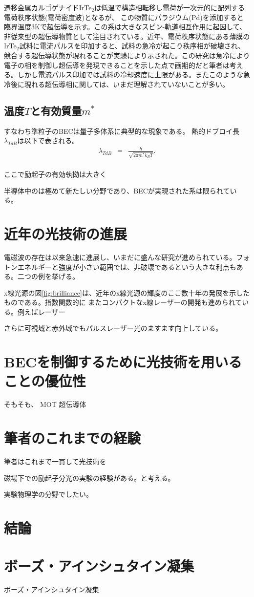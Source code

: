 \documentclass[11pt,a4paper]{jsarticle}
\begin{document}
遷移金属カルゴゲナイドIrTe$_2$は低温で構造相転移し電荷が一次元的に配列する電荷秩序状態(電荷密度波)となるが、
この物質にパラジウム(Pd)を添加すると臨界温度3Kで超伝導を示す\cite{IrTe2Pd_SC}。この系は大きなスピン-軌道相互作用に起因して、非従来型の超伝導物質として注目されている。近年、電荷秩序状態にある薄膜のIrTe$_2$試料に電流パルスを印加すると、試料の急冷が起こり秩序相が破壊され、競合する超伝導状態が現れることが実験により示された\cite{SC_IrTe2}。この研究は急冷により電子の相を制御し超伝導を発現できることを示した点で画期的だと筆者は考える。しかし電流パルス印加では試料の冷却速度に上限がある。またこのような急冷後に現れる超伝導相に関しては、いまだ理解されていないことが多い。

\subsection{温度$T$と有効質量$m^*$}
すなわち準粒子のBECは量子多体系に典型的な現象である。
熱的ドブロイ長$\lambda_{TdB}$は以下で表される。
\begin{eqnarray}
\lambda_{TdB} &=& \frac{h}{\sqrt{2\pi m^* k_B T}}.\\
\end{eqnarray}

ここで励起子の有効執拗は大きく

半導体中のは極めて新たしい分野であり、BECが実現された系は限られている。


\section{近年の光技術の進展}
電磁波の存在は以来急速に進展し、いまだに盛んな研究が進められている。フォトンエネルギーと強度が小さい範囲では、非破壊であるという大きな利点もある。二つの例を挙げる。	

x線光源の図\ref{fig:brilliance}は、近年のx線光源の輝度のここ数十年の発展を示したものである\cite{Als-Nielsen}。指数関数的に
またコンパクトなx線レーザーの開発も進められている。例えばレーザー

さらに可視域と赤外域でもパルスレーザー光のますます向上している。

\section{BECを制御するために光技術を用いることの優位性}
そもそも、
MOT
超伝導体

\cite{Fausti}

\section{筆者のこれまでの経験}
筆者はこれまで一貫して光技術を

磁場下での励起子分光の実験の経験がある。と考える。

実験物理学の分野でしたい。


\section{結論}


\section{ボーズ・アインシュタイン凝集}
ボーズ・アインシュタイン凝集



\end{document}

